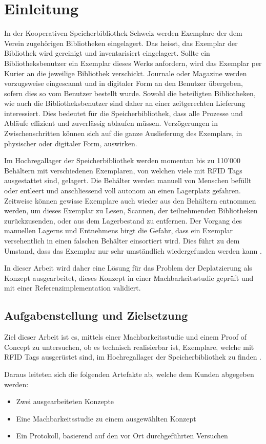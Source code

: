\chapter{Einleitung}
\label{ch:Einleitung}
In der Kooperativen Speicherbibliothek Schweiz werden Exemplare der dem Verein zugehörigen Bibliotheken eingelagert. Das heisst, das Exemplar der Bibliothek wird gereinigt und inventarisiert eingelagert. Sollte ein Bibliotheksbenutzer ein Exemplar dieses Werks anfordern, wird das Exemplar per Kurier an die jeweilige Bibliothek verschickt. Journale oder Magazine werden vorzugsweise eingescannt und in digitaler Form an den Benutzer übergeben, sofern dies so vom Benutzer bestellt wurde. Sowohl die beteiligten Bibliotheken, wie auch die Bibliotheksbenutzer sind daher an einer zeitgerechten Lieferung interessiert. Dies bedeutet für die Speicherbibliothek, dass alle Prozesse und Abläufe effizient und zuverlässig ablaufen müssen. Verzögerungen in Zwischenschritten können sich auf die ganze Auslieferung des Exemplars, in physischer oder digitaler Form, auswirken.

Im Hochregallager der Speicherbibliothek werden momentan bis zu 110'000 Behältern mit verschiedenen Exemplaren, von welchen viele mit RFID Tags ausgestattet sind, gelagert. Die Behälter werden manuell von Menschen befüllt oder entleert und anschliessend voll autonom an einen Lagerplatz gefahren. Zeitweise können gewisse Exemplare auch wieder aus den Behältern entnommen werden, um dieses Exemplar zu Lesen, Scannen, der teilnehmenden Bibliotheken zurückzusenden, oder aus dem Lagerbestand zu entfernen. Der Vorgang des manuellen Lagerns und Entnehmens birgt die Gefahr, dass ein Exemplar versehentlich in einen falschen Behälter einsortiert wird. Dies führt zu dem Umstand, dass das Exemplar nur sehr umständlich wiedergefunden werden kann \parencite{WickiBaumann2019Projektbeschrieb}.

In dieser Arbeit wird daher eine Lösung für das Problem der Deplatzierung als Konzept ausgearbeitet, dieses Konzept in einer Machbarkeitsstudie geprüft und mit einer Referenzimplementation validiert.

\section{Aufgabenstellung und Zielsetzung}
Ziel dieser Arbeit ist es, mittels einer Machbarkeitsstudie und einem Proof of Concept zu untersuchen, ob es technisch realisierbar ist, Exemplare, welche mit RFID Tags ausgerüstet sind, im Hochregallager der Speicherbibliothek zu finden \parencite{WickiBaumann2019Projektbeschrieb}.

Daraus leiteten sich die folgenden Artefakte ab, welche dem Kunden abgegeben werden:
\begin{itemize}
	\item Zwei ausgearbeiteten Konzepte
	\item Eine Machbarkeitsstudie zu einem ausgewählten Konzept
	\item Ein Protokoll, basierend auf den vor Ort durchgeführten Versuchen
\end{itemize}
